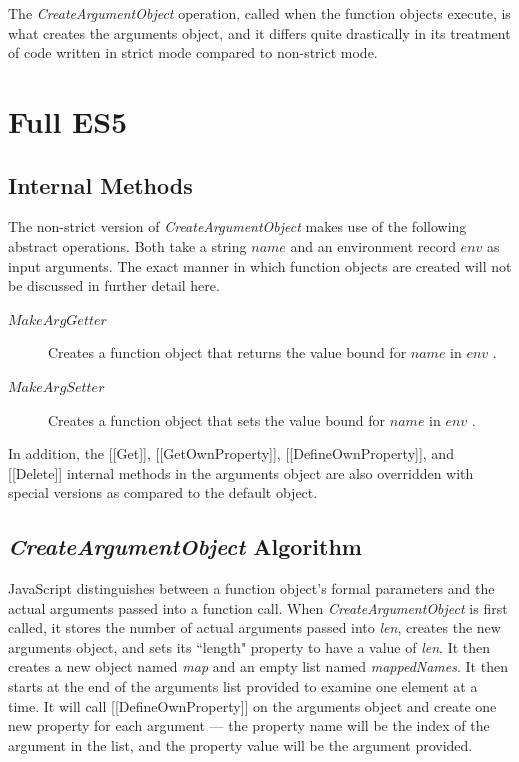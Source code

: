 \documentclass[a4paper,11pt,twoside]{report}
\begin{document}
The \textit{CreateArgumentObject} operation, called when the function objects execute, is what creates the arguments object, and it differs quite drastically in its treatment of code written in strict mode compared to non-strict mode. 

\section{Full ES5}
\subsection{Internal Methods}\label{sec:argobjIM}
The non-strict version of \textit{CreateArgumentObject} makes use of the following abstract operations. Both take a string $name$ and an environment record $env$ as input arguments. The exact manner in which function objects are created will not be discussed in further detail here.
\begin{description}
\item[$MakeArgGetter$] Creates a function object that returns the value bound for $name$ in $env$ \cite{EcmaScript}.
\item[$MakeArgSetter$] Creates a function object that sets the value bound for $name$ in $env$ \cite{EcmaScript}.
\end{description}

In addition, the [[Get]], [[GetOwnProperty]], [[DefineOwnProperty]], and [[Delete]] internal methods in the arguments object are also overridden with special versions as compared to the default object.

\subsection{\textit{CreateArgumentObject} Algorithm}
JavaScript distinguishes between a function object's formal parameters and the actual arguments passed into a function call. When \textit{CreateArgumentObject} is first called, it stores the number of actual arguments passed into \textit{len}, creates the new arguments object, and sets its ``length" property to have a value of \textit{len}. It then creates a new object named \textit{map} and an empty list named \textit{mappedNames}. It then starts at the end of the arguments list provided to examine one element at a time. It will call [[DefineOwnProperty]] on the arguments object and create one new property for each argument --- the property name will be the index of the argument in the list, and the property value will be the argument provided. 
\end{document}
